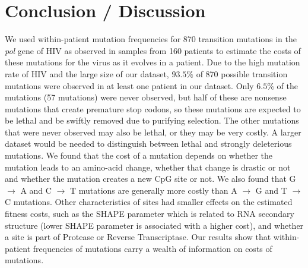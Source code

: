 \documentclass{article}
\begin{document}
\section{Conclusion / Discussion}
We used within-patient mutation frequencies for 870 transition mutations in the \textit {pol} gene of HIV as observed in samples from 160 patients \cite{bacheler2000human} to estimate the costs of these mutations for the virus as it evolves in a patient. Due to the high mutation rate of HIV and the large size of our dataset, $93.5\%$ of 870 possible transition mutations were observed in at least one patient in our dataset. Only $6.5\%$ of the mutations (57 mutations) were never observed, but half of these are nonsense mutations that create premature stop codons, so these mutations are expected to be lethal and be swiftly removed due to purifying selection. The other mutations that were never observed may also be lethal, or they may be very costly. A larger dataset would be needed to distinguish between lethal and strongly deleterious mutations. 
We found that the cost of a mutation depends on whether the mutation leads to an amino-acid change, whether that change is drastic or not and whether the mutation creates a new CpG site or not. We also found that G $\rightarrow$ A and C $\rightarrow$ T mutations are generally more costly than A $\rightarrow$ G and T $\rightarrow$ C mutations. 
Other characteristics of sites had smaller effects on the estimated fitness costs, such as the SHAPE parameter which is related to RNA secondary structure (lower SHAPE parameter is associated with a higher cost), and whether a site is part of Protease or Reverse Transcriptase. Our results show that within-patient frequencies of mutations carry a wealth of information on costs of mutations.
\end{document}
